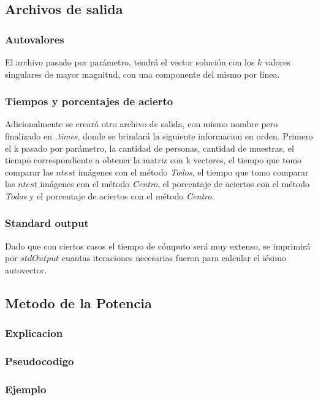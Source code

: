 \subsection{Archivos de salida}
\subsubsection{Autovalores}
El archivo pasado por par\'ametro, tendr\'a el vector soluci\'on con los $k$ valores singulares de mayor magnitud, con una
componente del mismo por l\'inea.

\subsubsection{Tiempos y porcentajes de acierto}
Adicionalmente se crear\'a otro archivo de salida, con mismo nombre pero finalizado en \emph{.times}, donde se brindar\'a la siguiente informacion en orden. Primero el k pasado por par\'ametro, la cantidad de personas, cantidad de muestras, el tiempo correspondiente a obtener la matriz con k vectores, el tiempo que tomo comparar las $ntest$ im\'agenes con el m\'etodo \emph{Todos}, el tiempo que tomo comparar las $ntest$ im\'agenes con el m\'etodo \emph{Centro}, el porcentaje de aciertos con el m\'etodo \emph{Todos} y el porcentaje de aciertos con el m\'etodo \emph{Centro}.

\subsubsection{Standard output}
Dado que con ciertos casos el tiempo de c\'omputo ser\'a muy extenso, se imprimir\'a por $stdOutput$ cuantas iteraciones necesarias fueron para calcular el i\'esimo autovector.

\subsection{Metodo de la Potencia}

  \subsubsection{Explicacion}
  
  \subsubsection{Pseudocodigo}
  
  \subsubsection{Ejemplo}
  

